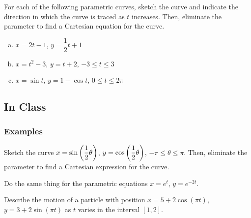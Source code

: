 \documentclass[notes2924]{subfiles}
\begin{document}
		\begin{ex}
			For each of the following parametric curves, sketch the curve and indicate the direction in which the curve is traced as $t$ increases.  Then, eliminate the parameter to find a Cartesian equation for the curve.
			\begin{enumerate}[(a)]
				\item $x = 2t -1 $, $y = \dfrac{1}{2}t + 1$
					
				\item $x = t^2 -3$, $y = t+2$, $-3\leq t\leq 3$
					
				\item $x = \sin t$, $y = 1-\cos t$, $0\leq t\leq 2\pi$
			\end{enumerate}
		\end{ex}
			\newpage
			
	\subsection*{In Class}
	\subsubsection*{Examples}
		\begin{ex}
			Sketch the curve $x = \sin \left( \dfrac{1}{2}\theta\right)$, $y = \cos \left( \dfrac{1}{2}\theta\right)$, $-\pi\leq\theta\leq\pi$.  Then, eliminate the parameter to find a Cartesian expression for the curve.
		\end{ex}
			\vs{1}
			
		\begin{ex}
			Do the same thing for the parametric equations $x = e^t$, $y = e^{-2t}$.
		\end{ex}
			\vs{1}
			
		\begin{ex}
			Describe the motion of a particle with position $x = 5+2\cos (\pi t)$, $y =3 + 2\sin (\pi t)$ as $t$ varies in the interval $[1,2]$.
		\end{ex}		
			\vs{1}
			\newpage
			
\end{document}
